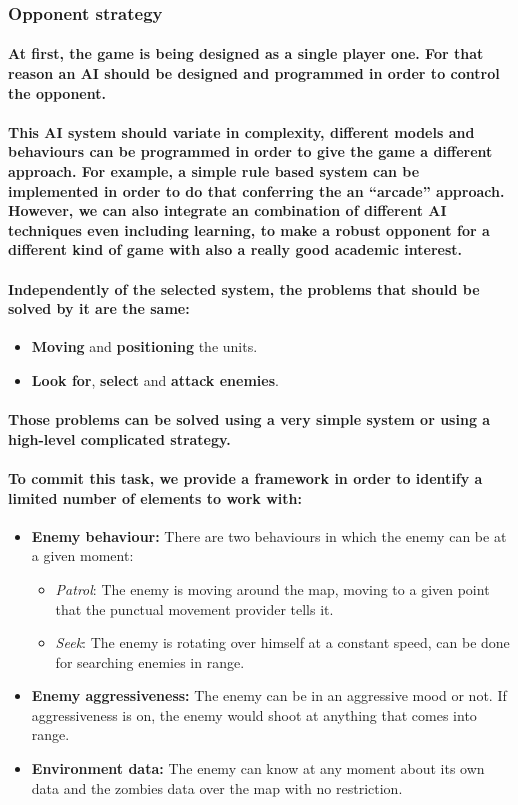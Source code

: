 \documentclass[a4paper,10pt]{article}
\newcommand{\p}[1]{\paragraph{\indent\textnormal{#1}}}
\begin{document}
   \subsubsection{Opponent strategy}

    \p{At first, the game is being designed as a single player one. For that reason an AI should be designed and programmed in order to control the opponent.}

    \p{This AI system should variate in complexity, different models and behaviours can be programmed in order to give the game a different approach. For example, a simple rule based system can be implemented in order to do that conferring the an ``arcade'' approach. However, we can also integrate an combination of different AI techniques even including learning, to make a robust opponent for a different kind of game with also a really good academic interest.}

    \p{Independently of the selected system, the problems that should be solved by it are the same:}

    \begin{itemize}
     \item \textbf{Moving} and \textbf{positioning} the units.
     \item \textbf{Look for}, \textbf{select} and \textbf{attack enemies}.
    \end{itemize}
  
    \p{Those problems can be solved using a very simple system or using a high-level complicated strategy.}

    \p{To commit this task, we provide a framework in order to identify a limited number of elements to work with:}

    \begin{itemize}
     \item \textbf{Enemy behaviour:} There are two behaviours in which the enemy can be at a given moment:
	 \begin{itemize}
	    \item \textit{Patrol}: The enemy is moving around the map, moving to a given point that the punctual movement provider tells it.
	    \item \textit{Seek}: The enemy is rotating over himself at a constant speed, can be done for searching enemies in range.
	  \end{itemize}

     \item \textbf{Enemy aggressiveness:} The enemy can be in an aggressive mood or not. If aggressiveness is on, the enemy would shoot at anything that comes into range.
     \item \textbf{Environment data:} The enemy can know at any moment about its own data and the zombies data over the map with no restriction.
    \end{itemize}
\end{document}
